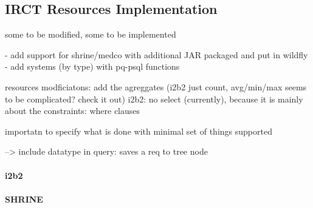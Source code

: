













\subsection{IRCT Resources Implementation}
some to be modified, some to be implemented

- add support for shrine/medco with additional JAR packaged and put in wildfly
- add systems (by type) with pq-psql functions

resources modficiatons: add the agreggates (i2b2 just count, avg/min/max seems to be complicated? check it out)
i2b2: no select (currently), because it is mainly about the constraints: where clauses

importatn to specify what is done with minimal set of things supported

--> include datatype in query: saves a req to tree node
\paragraph{i2b2}

\paragraph{SHRINE}

